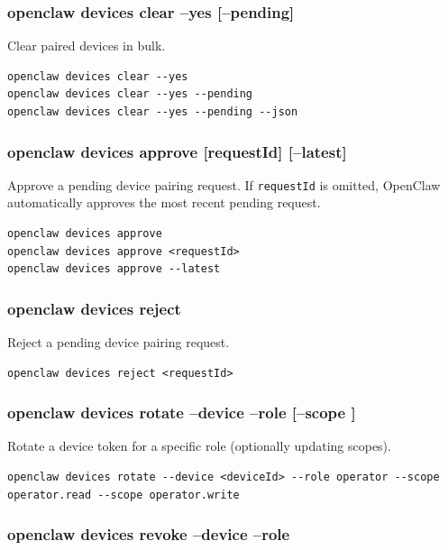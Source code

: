 \subsubsection{openclaw devices clear --yes [--pending]}


Clear paired devices in bulk.

\begin{lstlisting}
openclaw devices clear --yes
openclaw devices clear --yes --pending
openclaw devices clear --yes --pending --json
\end{lstlisting}


\subsubsection{openclaw devices approve [requestId] [--latest]}


Approve a pending device pairing request. If \texttt{requestId} is omitted, OpenClaw
automatically approves the most recent pending request.

\begin{lstlisting}
openclaw devices approve
openclaw devices approve <requestId>
openclaw devices approve --latest
\end{lstlisting}


\subsubsection{openclaw devices reject }


Reject a pending device pairing request.

\begin{lstlisting}
openclaw devices reject <requestId>
\end{lstlisting}


\subsubsection{openclaw devices rotate --device  --role  [--scope ]}


Rotate a device token for a specific role (optionally updating scopes).

\begin{lstlisting}
openclaw devices rotate --device <deviceId> --role operator --scope operator.read --scope operator.write
\end{lstlisting}


\subsubsection{openclaw devices revoke --device  --role }


